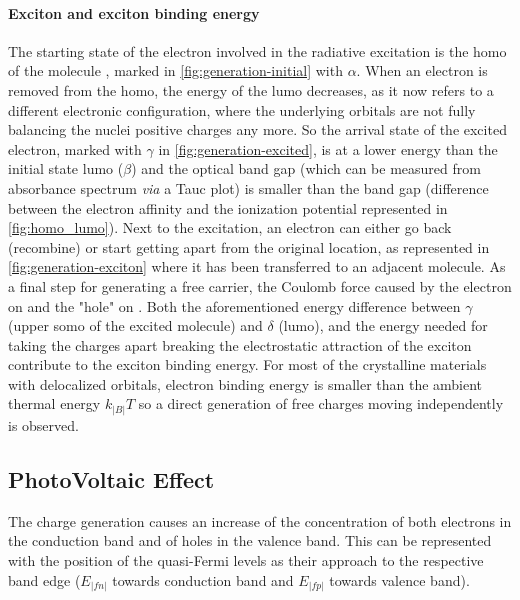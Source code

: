 		\paragraph{Exciton and exciton binding energy}\label{intro_exciton}
		The starting state of the electron involved in the radiative excitation is the \gls{homo} of the molecule , marked in \cref{fig:generation-initial} with $\alpha$.
		When an electron is removed from the \gls{homo}, the energy of the \gls{lumo} decreases, as it now refers to a different electronic configuration, where the underlying orbitals are not fully balancing the nuclei positive charges any more.
		So the arrival state of the excited electron, marked with $\gamma$ in \cref{fig:generation-excited}, is at a lower energy than the initial state \gls{lumo} ($\beta$) and the optical band gap (which can be measured from absorbance spectrum \textsl{via} a Tauc plot) is smaller than the band gap (difference between the electron affinity and the ionization potential represented in \cref{fig:homo_lumo}).
		Next to the excitation, an electron can either go back (recombine) or start getting apart from the original location, as represented in \cref{fig:generation-exciton} where it has been transferred to an adjacent molecule.
		As a final step for generating a free carrier, the Coulomb force caused by the electron on  and the "hole" on .
		Both the aforementioned energy difference between $\gamma$ (upper \gls{somo} of the excited molecule) and $\delta$ (\gls{lumo}), and the energy needed for taking the charges apart breaking the electrostatic attraction of the exciton contribute to the exciton binding energy.
		For most of the crystalline materials with delocalized orbitals, electron binding energy is smaller than the ambient thermal energy $k_|B|T$ so a direct generation of free charges moving independently is observed.

	\subsection{PhotoVoltaic Effect}
	The charge generation causes an increase of the concentration of both electrons in the conduction band and of holes in the valence band.
	This can be represented with the position of the quasi\hyp{}Fermi levels as their approach to the respective band edge ($E_|fn|$ towards conduction band and $E_|fp|$ towards valence band).
	

